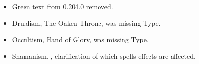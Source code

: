 \clearpage
{}

\vspace*{1cm}

\begin{itemize}[label={-}]
\item Green text from 0.204.0 removed.
\item Druidism, The Oaken Throne, was missing Type.
\item Occultism, Hand of Glory, was missing Type.
\item Shamanism, \shamanismspellfour{}, clarification of which spells effects are affected.
\end{itemize}



